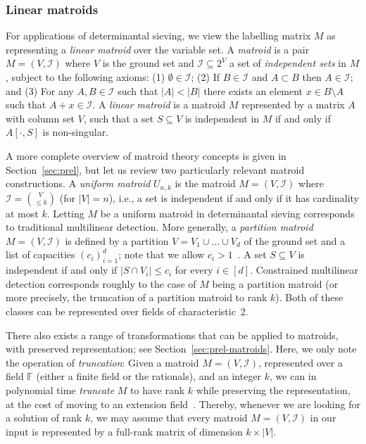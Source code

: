\documentclass[10pt,a4paper]{article}
\newcommand{\F}{\ensuremath{\mathbb F}\xspace}
\newcommand{\cI}{\ensuremath{\mathcal I}\xspace}
\begin{document}
\subsubsection{Linear matroids} \label{ssec:matroids}
For applications of determinantal sieving, we view the 
labelling matrix $M$ as representing a \emph{linear matroid} over the
variable set. A \emph{matroid} is a pair $M=(V,\cI)$ where $V$ is the
ground set and $\cI \subseteq 2^V$ a set of \emph{independent sets} in
$M$, subject to the following axioms:
(1) $\emptyset \in \cI$;
(2) If $B \in \cI$ and $A \subset B$ then $A \in \cI$; and 
(3)  For any $A, B \in \cI$ such that $|A|<|B|$ there exists an
  element $x \in B \setminus A$ such that $A+x \in \cI$.
  A \emph{linear matroid} is a matroid $M$ represented by a matrix $A$ with
column set $V$, such that a set $S \subseteq V$ is independent in $M$
if and only if $A[\cdot,S]$ is non-singular. 

A more complete overview of matroid theory concepts is given in
Section~\ref{sec:prel}, but let us review two particularly
relevant matroid constructions. 
A \emph{uniform matroid} $U_{n,k}$ is the matroid $M=(V,\cI)$
  where $\cI=\binom{V}{\leq k}$ (for $|V|=n$), i.e., a set is
  independent if and only if it has cardinality at most $k$.
  Letting $M$ be a uniform matroid in determinantal sieving
  corresponds to traditional multilinear detection.
  More generally, 
  a \emph{partition matroid} $M=(V,\cI)$ is defined by a partition
  $V=V_1 \cup \ldots \cup V_d$ of the ground set and a list of
  capacities $(c_i)_{i=1}^d$; note that we allow $c_i>1$~\cite{OxleyBook}. 
A set $S \subseteq V$ is independent if
  and only if $|S \cap V_i| \leq c_i$ for every $i \in [d]$.
  Constrained multilinear detection corresponds roughly to the case of
  $M$ being a partition matroid (or more precisely, the truncation of
  a partition matroid to rank $k$).
Both of these classes can be represented over fields of characteristic~2.

There also exists a range of transformations that can be applied
to matroids, with preserved representation; see
Section~\ref{sec:prel-matroids}. Here, we only note the 
operation of \emph{truncation}: Given a matroid $M=(V,\cI)$,
represented over a field $\F$ (either a finite field or the rationals), and an integer $k$,
we can in polynomial time \emph{truncate} $M$ to have rank $k$ while preserving the representation,
at the cost of moving to an extension field~\cite{LokshtanovMPS18,Marx09-matroid}.
Thereby, whenever we are looking for a solution of rank $k$,
we may assume that every matroid $M=(V,\cI)$ in our input
is represented by a full-rank matrix of dimension $k \times |V|$.
\end{document}
